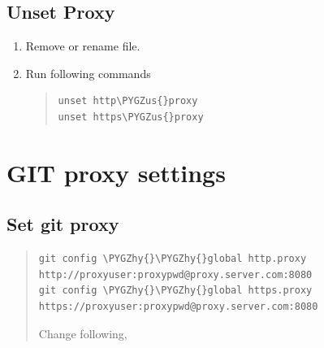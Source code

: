 \documentclass[letterpaper,10pt,english]{sphinxmanual}
\def\PYGZus{\char`\_}
\def\PYGZhy{\char`\-}
\begin{document}
\subsection{Unset Proxy}
\label{_source/things/proxy_linux:unset-proxy}\begin{enumerate}
\item {} 
Remove or rename  file.

\item {} 
Run following commands
\begin{quote}

\begin{Verbatim}[commandchars=\\\{\}]
unset http\PYGZus{}proxy
unset https\PYGZus{}proxy
\end{Verbatim}
\end{quote}

\end{enumerate}


\section{GIT proxy settings}
\label{_source/things/git_proxy:git-proxy-settings}\label{_source/things/git_proxy::doc}

\subsection{Set git proxy}
\label{_source/things/git_proxy:set-git-proxy}\begin{quote}

\begin{Verbatim}[commandchars=\\\{\}]
git config \PYGZhy{}\PYGZhy{}global http.proxy http://proxyuser:proxypwd@proxy.server.com:8080
git config \PYGZhy{}\PYGZhy{}global https.proxy https://proxyuser:proxypwd@proxy.server.com:8080
\end{Verbatim}
\begin{description}
\item[{Change following,}] \leavevmode
{}

\end{description}
\end{quote}
\end{document}
